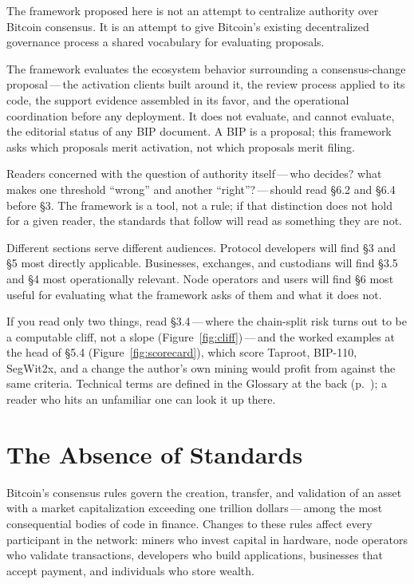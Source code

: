 \documentclass[11pt, twoside, openright]{book}
\newcommand{\sect}[1]{\S#1}
\begin{document}
The framework proposed here is not an attempt to centralize authority over Bitcoin consensus. It is an attempt to give Bitcoin's existing decentralized governance process a shared vocabulary for evaluating proposals.

The framework evaluates the ecosystem behavior surrounding a consensus-change proposal\,---\,the activation clients built around it, the review process applied to its code, the support evidence assembled in its favor, and the operational coordination before any deployment. It does not evaluate, and cannot evaluate, the editorial status of any BIP document. A BIP is a proposal; this framework asks which proposals merit activation, not which proposals merit filing.

Readers concerned with the question of authority itself\,---\,who decides? what makes one threshold ``wrong'' and another ``right''?\,---\,should read \sect{6.2} and \sect{6.4} before \sect{3}. The framework is a tool, not a rule; if that distinction does not hold for a given reader, the standards that follow will read as something they are not.

Different sections serve different audiences. Protocol developers will find \sect{3} and \sect{5} most directly applicable. Businesses, exchanges, and custodians will find \sect{3.5} and \sect{4} most operationally relevant. Node operators and users will find \sect{6} most useful for evaluating what the framework asks of them and what it does not.

If you read only two things, read \sect{3.4}\,---\,where the chain-split risk turns out to be a computable cliff, not a slope (Figure~\ref{fig:cliff})\,---\,and the worked examples at the head of \sect{5.4} (Figure~\ref{fig:scorecard}), which score Taproot, BIP-110, SegWit2x, and a change the author's own mining would profit from against the same criteria. Technical terms are defined in the Glossary at the back (p.~\pageref{glossary}); a reader who hits an unfamiliar one can look it up there.

\section{The Absence of Standards}

Bitcoin's consensus rules govern the creation, transfer, and validation of an asset with a market capitalization exceeding one trillion dollars\,---\,among the most consequential bodies of code in finance. Changes to these rules affect every participant in the network: miners who invest capital in hardware, node operators who validate transactions, developers who build applications, businesses that accept payment, and individuals who store wealth.
\end{document}
